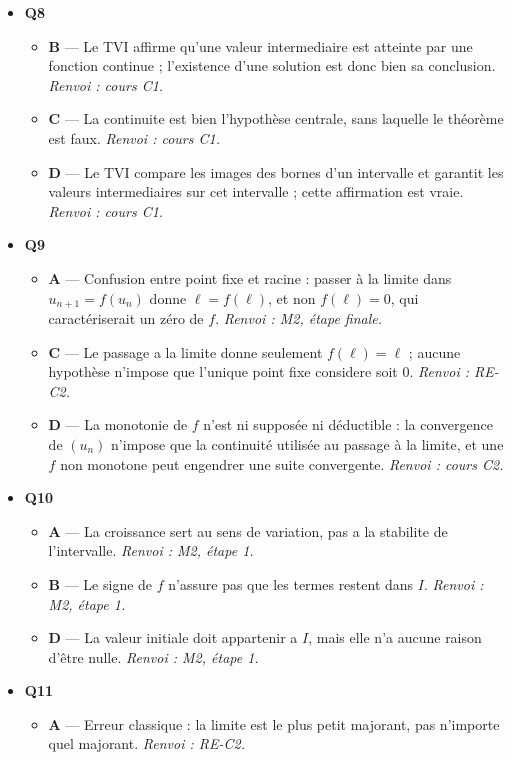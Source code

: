 \begin{itemize}
\begin{itemize}
  \end{itemize}
  \item \textbf{Q8}
  \begin{itemize}
    \item \textbf{B} — Le TVI affirme qu'une valeur intermediaire est atteinte par une fonction continue ; l'existence d'une solution est donc bien sa conclusion. \emph{Renvoi : cours C1.}
    \item \textbf{C} — La continuite est bien l'hypothèse centrale, sans laquelle le théorème est faux. \emph{Renvoi : cours C1.}
    \item \textbf{D} — Le TVI compare les images des bornes d'un intervalle et garantit les valeurs intermediaires sur cet intervalle ; cette affirmation est vraie. \emph{Renvoi : cours C1.}
  \end{itemize}
  \item \textbf{Q9}
  \begin{itemize}
    \item \textbf{A} — Confusion entre point fixe et racine : passer à la limite dans $u_{n+1}=f(u_n)$ donne $\ell=f(\ell)$, et non $f(\ell)=0$, qui caractériserait un zéro de $f$. \emph{Renvoi : M2, étape finale.}
    \item \textbf{C} — Le passage a la limite donne seulement $f(\ell)=\ell$ ; aucune hypothèse n'impose que l'unique point fixe considere soit $0$. \emph{Renvoi : RE-C2.}
    \item \textbf{D} — La monotonie de $f$ n'est ni supposée ni déductible : la convergence de $(u_n)$ n'impose que la continuité utilisée au passage à la limite, et une $f$ non monotone peut engendrer une suite convergente. \emph{Renvoi : cours C2.}
  \end{itemize}
  \item \textbf{Q10}
  \begin{itemize}
    \item \textbf{A} — La croissance sert au sens de variation, pas a la stabilite de l'intervalle. \emph{Renvoi : M2, étape 1.}
    \item \textbf{B} — Le signe de $f$ n'assure pas que les termes restent dans $I$. \emph{Renvoi : M2, étape 1.}
    \item \textbf{D} — La valeur initiale doit appartenir a $I$, mais elle n'a aucune raison d'être nulle. \emph{Renvoi : M2, étape 1.}
  \end{itemize}
  \item \textbf{Q11}
  \begin{itemize}
    \item \textbf{A} — Erreur classique : la limite est le plus petit majorant, pas n'importe quel majorant. \emph{Renvoi : RE-C2.}

\end{itemize}
\end{itemize}
